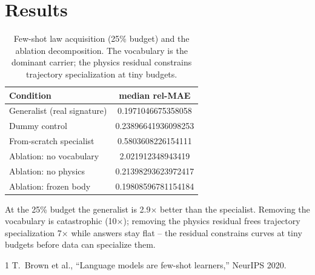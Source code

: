 \documentclass[conference,10pt]{IEEEtran}
\begin{document}
\section{Results}
\begin{table}[!t]
\caption{Few-shot law acquisition (25\% budget) and the ablation
decomposition. The vocabulary is the dominant carrier; the physics
residual constrains trajectory specialization at tiny budgets.}
\label{tab:fewshot}
\centering
\begin{tabular}{lc}
\toprule
Condition & median rel-MAE \\
\midrule
Generalist (real signature) & 0.1971046675358058 \\
Dummy control & 0.23896641936098253 \\
From-scratch specialist & 0.5803608226154111 \\
Ablation: no vocabulary & 2.021912348943419 \\
Ablation: no physics & 0.21398293623972417 \\
Ablation: frozen body & 0.19808596781154184 \\
\bottomrule
\end{tabular}
\end{table}

At the 25\% budget the generalist is 2.9$\times$ better than the specialist. Removing the vocabulary is catastrophic (10$\times$); removing the physics residual frees trajectory specialization 7$\times$ while answers stay flat -- the residual constrains curves at tiny budgets before data can specialize them.

\begin{thebibliography}{1}
 T.~Brown et al., ``Language models are few-shot learners,'' NeurIPS 2020.
\end{thebibliography}
\end{document}
